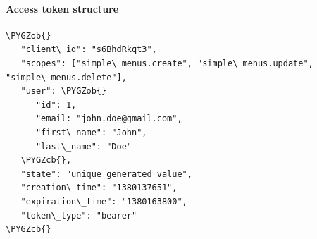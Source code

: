 \documentclass[letterpaper,10pt,english]{sphinxmanual}
\def\PYGZob{\char`\{}
\def\PYGZcb{\char`\}}
\begin{document}
\paragraph{Access token structure}
\label{features/oauth2/tokens_format:access-token-structure}
\begin{Verbatim}[commandchars=\\\{\}]
\PYGZob{}
   "client\_id": "s6BhdRkqt3",
   "scopes": ["simple\_menus.create", "simple\_menus.update", "simple\_menus.delete"],
   "user": \PYGZob{}
      "id": 1,
      "email: "john.doe@gmail.com",
      "first\_name": "John",
      "last\_name": "Doe"
   \PYGZcb{},
   "state": "unique generated value",
   "creation\_time": "1380137651",
   "expiration\_time": "1380163800",
   "token\_type": "bearer"
\PYGZcb{}
\end{Verbatim}
\end{document}
